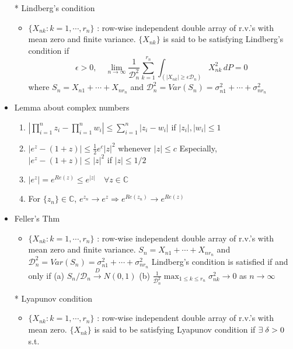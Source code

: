 \documentclass[12pt, A4]{article}
\begin{document}
\begin{itemize}
	\item[*] Lindberg's condition
	\begin{itemize}
		\item $\{X_{nk}:k=1,\cdots, r_n\}$ : row-wise independent double array of r.v.'s with mean zero and finite variance.  $\{X_{nk}\}$ is said to be satisfying Lindberg's condition if
		$$\epsilon>0, \quad 
		\lim_{n \to \infty}\frac{1}{\mathcal{D}_n^2}\sum_{k=1}^{r_n}\int_{(|X_{nk}|\geq \epsilon\mathcal{D}_n)} X_{nk}^2\,dP=0$$
		\newline where $S_n=X_{n1}+\cdots+X_{nr_n}$ and $\mathcal{D}_n^2=Var(S_n)=\sigma_{n1}^2+\cdots+\sigma_{nr_n}^2$
	\end{itemize}
\clearpage
	\item Lemma about complex numbers
	\begin{enumerate}
		\item $\left|\prod_{i=1}^{n}z_i-\prod_{i=1}^{n}w_i\right|\leq \sum_{i=1}^{n}|z_i-w_i|$ if $|z_i|,|w_i|\leq 1$
		\item $|e^z-(1+z)|\leq \frac12 e^c|z|^2$ whenever $|z|\leq c$
		\newline Especially, $|e^z-(1+z)|\leq |z|^2$ if $|z|\leq 1/2$
		\item $|e^z|=e^{Re(z)}\leq e^{|z|} \quad \forall z\in \mathbb{C}$
		\item For $\{z_n\}\in \mathbb{C}$, $e^{z_n}\rightarrow e^z \Rightarrow e^{Re(z_n)}\rightarrow e^{Re(z)}$
	\end{enumerate}
	\item Feller's Thm
	\begin{itemize}
		\item $\{X_{nk}:k=1,\cdots, r_n\}$ : row-wise independent double array of r.v.'s with mean zero and finite variance. $S_n=X_{n1}+\cdots+X_{nr_n}$ and $\mathcal{D}_n^2=Var(S_n)=\sigma_{n1}^2+\cdots+\sigma_{nr_n}^2$
		\newline Lindberg's condition is satisfied if and only if \newline(a) $S_n/\mathcal{D}_n \xrightarrow{D} N(0,1)$ \hspace{0,2cm}(b) $\frac{1}{\mathcal{D}_n^2}\max_{1\leq k\leq r_n}\sigma_{nk}^2\rightarrow0$ as $n\rightarrow \infty$
	\end{itemize}
	\item[*] Lyapunov condition
	\begin{itemize}
		\item $\{X_{nk}:k=1,\cdots, r_n\}$ : row-wise independent double array of r.v.'s with mean zero.
		\newline $\{X_{nk}\}$ is said to be satisfying Lyapunov condition if $\exists \hspace{0.1cm}\delta>0$ s.t.

\end{itemize}
\end{itemize}
\end{document}
